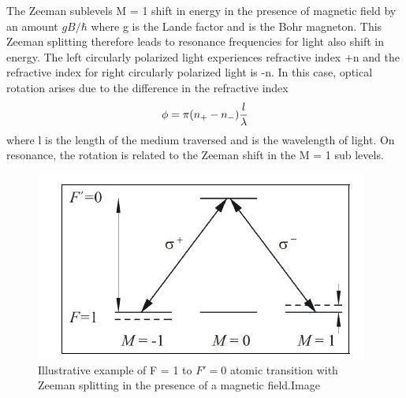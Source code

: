 The Zeeman sublevels M = 1 shift in energy in the presence of magnetic field by an amount $gB/\hbar$ where g is the Lande factor and is the Bohr magneton. This Zeeman splitting therefore leads to resonance frequencies for light also shift in energy. The left circularly polarized light experiences refractive index +n and the refractive index for right circularly polarized light is -n. In this case, optical rotation arises due to the difference in the refractive index 
\begin{equation}
\label{eq:emc}
\phi = \pi(n_+-n_{-})\frac{l}{\lambda} \\
\end{equation}
where l is the length of the medium traversed and is the wavelength of light. On resonance, the rotation is related to the Zeeman shift in the M = 1 sub levels.
\begin{figure}[h]
\centering
\includegraphics[width=0.75\linewidth]{figures/optical_rotation}
\caption{Illustrative example of F = 1 to $F' = 0$ atomic transition with Zeeman
splitting in the presence of a magnetic field.Image\cite{Budker2002JU2}}
\end{figure}

